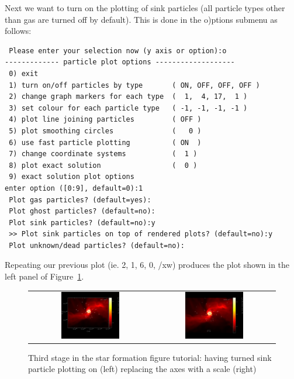 \documentclass[a4paper,11pt]{article}
\begin{document}
 Next we want to turn on the plotting of sink particles (all particle types other than gas are turned off by default). This is done in the o)ptions submenu as follows:
\begin{verbatim}
 Please enter your selection now (y axis or option):o
------------- particle plot options -------------------
 0) exit 
 1) turn on/off particles by type       ( ON, OFF, OFF, OFF )
 2) change graph markers for each type  (  1,  4, 17,  1 )
 3) set colour for each particle type   ( -1, -1, -1, -1 )
 4) plot line joining particles         ( OFF ) 
 5) plot smoothing circles              (   0 ) 
 6) use fast particle plotting          ( ON  ) 
 7) change coordinate systems           (  1 ) 
 8) plot exact solution                 (  0 ) 
 9) exact solution plot options 
enter option ([0:9], default=0):1
 Plot gas particles? (default=yes):
 Plot ghost particles? (default=no):
 Plot sink particles? (default=no):y
 >> Plot sink particles on top of rendered plots? (default=no):y
 Plot unknown/dead particles? (default=no):
\end{verbatim}
 Repeating our previous plot (ie. 2, 1, 6, 0, /xw) produces the plot shown in the left panel of Figure~\ref{fig:starpart3}. 
 \begin{figure}[h]
\begin{center}
\begin{tabular}{cc}
\includegraphics[width=0.5\textwidth]{starpart5.png} &
\includegraphics[width=0.5\textwidth]{starpart6.png}
\end{tabular}
\caption{Third stage in the star formation figure tutorial: having turned sink particle plotting on (left) replacing the axes with a scale (right)}
\label{fig:starpart3}
\end{center}
\end{figure}
\end{document}
